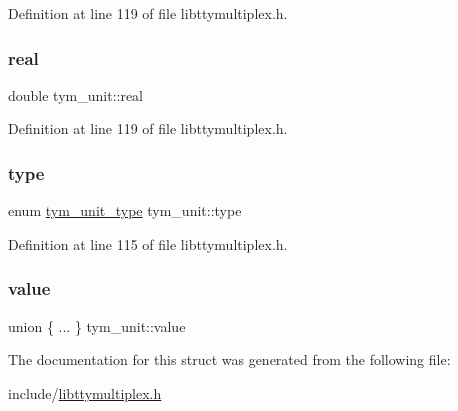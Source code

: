 Definition at line 119 of file libttymultiplex.\+h.

\mbox{\label{structtym__unit_a1335c8f102b171eae5743a25eaabb5ae}} 
\subsubsection{\texorpdfstring{real}{real}}
{\footnotesize\ttfamily double tym\+\_\+unit\+::real}



Definition at line 119 of file libttymultiplex.\+h.

\mbox{\label{structtym__unit_aa9af5f13506cbb15b261f7086cb16172}} 
\subsubsection{\texorpdfstring{type}{type}}
{\footnotesize\ttfamily enum \hyperlink{libttymultiplex_8h_a11fda113de846a40d8d1851f94bc4415}{tym\+\_\+unit\+\_\+type} tym\+\_\+unit\+::type}



Definition at line 115 of file libttymultiplex.\+h.

\mbox{\label{structtym__unit_ab7efee5776cd58e5d8b6806e39a49c49}} 
\subsubsection{\texorpdfstring{value}{value}}
{\footnotesize\ttfamily union \{ ... \}   tym\+\_\+unit\+::value}



The documentation for this struct was generated from the following file\+:\begin{DoxyCompactItemize}
\item 
include/\hyperlink{libttymultiplex_8h}{libttymultiplex.\+h}\end{DoxyCompactItemize}

